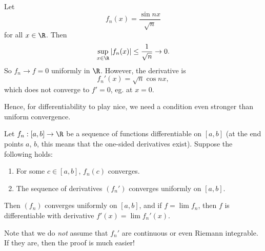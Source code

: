\documentclass[a4paper]{article}
\begin{document}
\begin{eg}
  Let
  \[
    f_n(x) = \frac{\sin nx}{\sqrt{n}}
  \]
  for all $x\in \R$. Then
  \[
    \sup_{x\in \R}|f_n (x)| \leq \frac{1}{\sqrt{n}} \to 0.
  \]
  So $f_n \to f = 0$ uniformly in $\R$. However, the derivative is
  \[
    f_n'(x) = \sqrt{n} \cos nx,
  \]
  which does not converge to $f' = 0$, eg. at $x = 0$.
\end{eg}

Hence, for differentiability to play nice, we need a condition even stronger than uniform convergence.
\begin{thm}
  Let $f_n: [a, b]\to \R$ be a sequence of functions differentiable on $[a, b]$ (at the end points $a$, $b$, this means that the one-sided derivatives exist). Suppose the following holds:
  \begin{enumerate}
    \item For some $c\in [a, b]$, $f_n(c)$ converges.
    \item The sequence of derivatives $(f_n')$ converges uniformly on $[a, b]$.
  \end{enumerate}
  Then $(f_n)$ converges uniformly on $[a, b]$, and if $f = \lim f_n$, then $f$ is differentiable with derivative $f'(x) = \lim f_n'(x)$.
\end{thm}
Note that we do \emph{not} assume that $f_n'$ are continuous or even Riemann integrable. If they are, then the proof is much easier!
\end{document}
